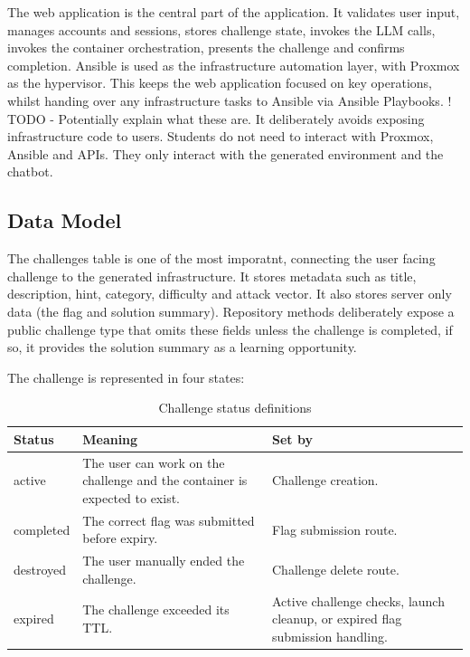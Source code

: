 The web application is the central part of the application. It validates user input, manages accounts and sessions, stores challenge state, invokes the LLM calls, invokes the container orchestration, presents the challenge and confirms completion. Ansible is used as the infrastructure automation layer, with Proxmox as the hypervisor. This keeps the web application focused on key operations, whilst handing over any infrastructure tasks to Ansible via Ansible Playbooks.
! TODO - Potentially explain what these are.
It deliberately avoids exposing infrastructure code to users. Students do not need to interact with Proxmox, Ansible and APIs. They only interact with the generated environment and the chatbot.

\subsection{Data Model}\label{sec:data_model}


The challenges table is one of the most imporatnt, connecting the user facing challenge to the generated infrastructure. It stores metadata such as title, description, hint, category, difficulty and attack vector. It also stores server only data (the flag and solution summary). Repository methods deliberately expose a public challenge type that omits these fields unless the challenge is completed, if so, it provides the solution summary as a learning opportunity. 

The challenge is represented in four states:

\begin{table}[h]
    \centering
    \begin{tabular}{@{}>{\raggedright\arraybackslash}p{2cm}p{7cm}p{5cm}@{}}
        \toprule
        \textbf{Status} & \textbf{Meaning} & \textbf{Set by} \\
        \midrule
        active & The user can work on the challenge and the container is expected to exist. & Challenge creation. \\
        \addlinespace
        completed & The correct flag was submitted before expiry. & Flag submission route. \\
        \addlinespace
        destroyed & The user manually ended the challenge. & Challenge delete route. \\
        \addlinespace
        expired & The challenge exceeded its TTL. & Active challenge checks, launch cleanup, or expired flag submission handling. \\
        \bottomrule
    \end{tabular}
    \caption{Challenge status definitions}
    \label{tab:challenge-status}
\end{table}

